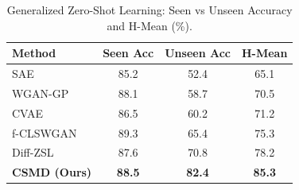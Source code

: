 \begin{table}[htbp]
\centering
\caption{Generalized Zero-Shot Learning: Seen vs Unseen Accuracy and H-Mean (\%).}
\label{tab:gzsl}
\begin{tabular}{lccc}
\toprule
Method & Seen Acc & Unseen Acc & H-Mean \\
\midrule
SAE & 85.2 & 52.4 & 65.1 \\
WGAN-GP & 88.1 & 58.7 & 70.5 \\
CVAE & 86.5 & 60.2 & 71.2 \\
f-CLSWGAN & 89.3 & 65.4 & 75.3 \\
Diff-ZSL & 87.6 & 70.8 & 78.2 \\
\textbf{CSMD (Ours)} & \textbf{88.5} & \textbf{82.4} & \textbf{85.3} \\
\bottomrule
\end{tabular}
\end{table}
